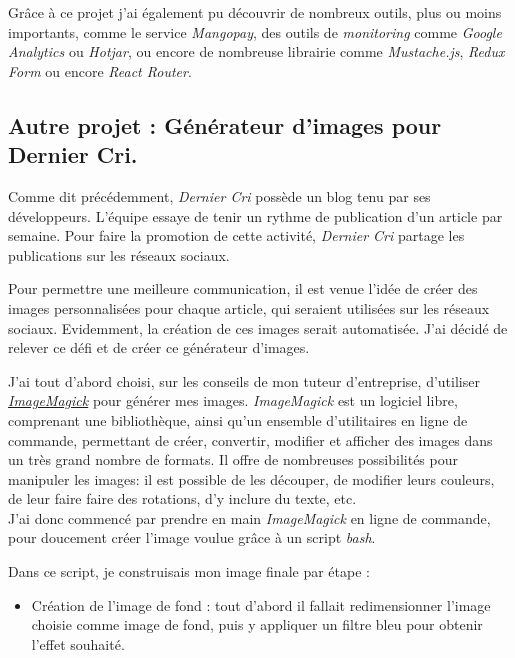 \bigskip

Grâce à ce projet j'ai également pu découvrir de nombreux outils, plus
ou moins importants, comme le service \emph{Mangopay}, des outils de
\emph{monitoring} comme \emph{Google Analytics} ou \emph{Hotjar}, ou
encore de nombreuse librairie comme \emph{Mustache.js}, \emph{Redux
Form} ou encore \emph{React Router}.

\bigskip

\subsection{Autre projet : Générateur d'images pour Dernier
Cri.}\label{autre-projet-guxe9nuxe9rateur-dimages-pour-dernier-cri.}

\bigskip

Comme dit précédemment, \emph{Dernier Cri} possède un blog tenu par ses
développeurs. L'équipe essaye de tenir un rythme de publication d'un
article par semaine. Pour faire la promotion de cette activité,
\emph{Dernier Cri} partage les publications sur les réseaux sociaux.

\bigskip

Pour permettre une meilleure communication, il est venue l'idée de créer
des images personnalisées pour chaque article, qui seraient utilisées
sur les réseaux sociaux. Evidemment, la création de ces images serait
automatisée. J'ai décidé de relever ce défi et de créer ce générateur
d'images.

\bigskip

J'ai tout d'abord choisi, sur les conseils de mon tuteur d'entreprise,
d'utiliser
\href{https://www.imagemagick.org/script/index.php}{\emph{ImageMagick}}
pour générer mes images. \emph{ImageMagick} est un logiciel libre,
comprenant une bibliothèque, ainsi qu'un ensemble d'utilitaires en ligne
de commande, permettant de créer, convertir, modifier et afficher des
images dans un très grand nombre de formats. Il offre de nombreuses
possibilités pour manipuler les images: il est possible de les découper,
de modifier leurs couleurs, de leur faire faire des rotations, d'y
inclure du texte, etc.\\
J'ai donc commencé par prendre en main \emph{ImageMagick} en ligne de
commande, pour doucement créer l'image voulue grâce à un script
\emph{bash}.

\bigskip

Dans ce script, je construisais mon image finale par étape :

\begin{itemize}
\tightlist
\item
  Création de l'image de fond : tout d'abord il fallait redimensionner
  l'image choisie comme image de fond, puis y appliquer un filtre bleu
  pour obtenir l'effet souhaité.
\end{itemize}

